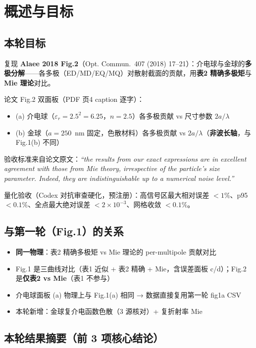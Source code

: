 \section{概述与目标}

\subsection{本轮目标}

复现 \textbf{Alaee 2018 Fig.2}（Opt. Commun.\ 407 (2018) 17--21）：介电球与金球的\textbf{多极分解}——各多极（ED/MD/EQ/MQ）对散射截面的贡献，用\textbf{表2 精确多极矩}与 \textbf{Mie 理论}对比。

论文 Fig.2 双面板（PDF 页4 caption 逐字）：
\begin{itemize}
  \item (a) 介电球（$\varepsilon_r = 2.5^2 = 6.25$，$n=2.5$）各多极贡献 vs 尺寸参数 $2a/\lambda$
  \item (b) 金球（$a=250$~nm 固定，色散材料）各多极贡献 vs $2a/\lambda$（\textbf{非波长轴}，与 Fig.1(b) 不同）
\end{itemize}

验收标准来自论文原文：\textit{``the results from our exact expressions are in excellent agreement with those from Mie theory, irrespective of the particle's size parameter. Indeed, they are indistinguishable up to a numerical noise level.''}

量化验收（Codex 对抗审查硬化，预注册）：高信号区最大相对误差 $<1\%$、p95 $<0.1\%$、全点最大绝对误差 $<2\times10^{-3}$、网格收敛 $<0.1\%$。

\subsection{与第一轮（Fig.1）的关系}

\begin{itemize}
  \item \textbf{同一物理}：表2 精确多极矩 vs Mie 理论的 per-multipole 贡献对比
  \item Fig.1 是三曲线对比（表1 近似 + 表2 精确 + Mie，含误差面板 c/d）；Fig.2 是\textbf{仅表2 vs Mie}（表1 不参与）
  \item 介电球面板 (a) 物理上与 Fig.1(a) 相同 → 数据直接复用第一轮 fig1a CSV
  \item 本轮新增：金球复介电函数色散（3 源核对）+ 复折射率 Mie
\end{itemize}

\subsection{本轮结果摘要（前 3 项核心结论）}

